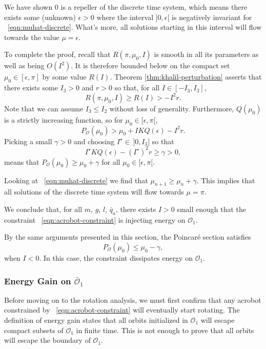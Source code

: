 We have shown \(0\) is a repeller of the discrete time system, which means
there exists some (unknown) \(\epsilon > 0\) where the interval
\(]0,\epsilon[\) is negatively invariant for ~\eqref{eqn:muhat-discrete}.
What's more, all solutions starting in this interval will flow towards the value
\(\mu = \epsilon\).

To complete the proof, recall that \(R(\pi,\mu_0,I)\) is smooth in all its
parameters as well as being \(O(I^2)\).
It is therefore bounded below on the compact set \(\mu_0 \in [\epsilon,\pi]\)
by some value \(\underbar{R}(I)\). 
Theorem \ref{thm:khalil-perturbation} asserts that there exists some
\(I_3 > 0\) and \(r > 0\) so that, for all \(I \in [-I_3, I_3]\),
\[
    R(\pi,\mu_0,I) \geq \underbar{R}(I) > -I^2 r
    .
\]
Note that we can assume \(I_3 \leq I_2\) without loss of generality.
Furthermore, \(Q(\mu_0)\) is a strictly increasing function, so
for \(\mu_0 \in [\epsilon,\pi[\),
\[
    P_\mathcal{O}(\mu_0) > \mu_0 + I K Q(\epsilon) - I^2 r
    .
\]
Picking a small \(\gamma > 0\) and choosing 
\(I^\star \in\, ]0, I_3]\) so that
\[
    I^\star K Q(\epsilon) - (I^\star)^2 r \geq \gamma > 0
    ,
\]
means that \( P_\mathcal{O}(\mu_0) \geq \mu_0 + \gamma\)
for all \(\mu_0 \in [\epsilon,\pi[\).

Looking at ~\eqref{eqn:muhat-discrete} we find that
\(\mu_{n+1} \geq \mu_n + \gamma\). 
This implies that all solutions of the discrete time system will flow towards
\(\mu = \pi\).

We conclude that, for all \(m\), \(g\), \(l\), \(\bar{q}_a\), 
there exists \(I > 0\) small enough that the constraint 
~\eqref{eqn:acrobot-constraint} is injecting energy on \(\mathcal{O}_1\).

By the same arguments presented in this section, the Poincar\'{e} section
satisfies
\[
    P_\mathcal{O}(\mu_0) \leq \mu_0 - \gamma
    ,
\] 
when \(I < 0\). 
In this case, the constraint dissipates energy on \(\mathcal{O}_1\).

\subsubsection*{Energy Gain on \(\bar{\mathcal{O}}_1\)}
Before moving on to the rotation analysis, we must first confirm that any
acrobot constrained by ~\eqref{eqn:acrobot-constraint} will eventually start
rotating.
The definition of energy gain states that all orbits initialized in
\(\mathcal{O}_1\) will escape compact subsets of \(\mathcal{O}_1\) in finite time. 
This is not enough to prove that all orbits will escape the boundary of
\(\mathcal{O}_1\). 

